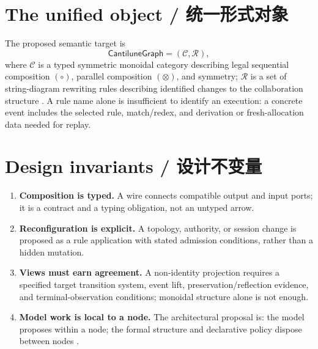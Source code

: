 \label{ch:overview}

\section{The unified object / 统一形式对象}

The proposed semantic target is
\begin{equation}
  \mathsf{CantiluneGraph}=(\mathcal C,\mathcal R),
  \label{eq:cantilune-graph}
\end{equation}
where \(\mathcal C\) is a typed symmetric monoidal category describing legal sequential
composition \((\circ)\), parallel composition \((\otimes)\), and symmetry; \(\mathcal R\) is a
set of string-diagram rewriting rules describing identified changes to the collaboration
structure \citep{cantiluneSpec,cantiluneRFCOne}. A rule name alone is insufficient to identify an
execution: a concrete event includes the selected rule, match/redex, and derivation or
fresh-allocation data needed for replay.



\section{Design invariants / 设计不变量}

\begin{MWMetricGrid}
\end{MWMetricGrid}

\begin{enumerate}
  \item \textbf{Composition is typed.} A wire connects compatible output and input ports; it is a
    contract and a typing obligation, not an untyped arrow.
  \item \textbf{Reconfiguration is explicit.} A topology, authority, or session change is proposed
    as a rule application with stated admission conditions, rather than a hidden mutation.
  \item \textbf{Views must earn agreement.} A non-identity projection requires a specified target
    transition system, event lift, preservation/reflection evidence, and terminal-observation
    conditions; monoidal structure alone is not enough.
  \item \textbf{Model work is local to a node.} The architectural proposal is: the model proposes
    within a node; the formal structure and declarative policy dispose between nodes
    \citep{cantiluneRFCOne}.
\end{enumerate}

